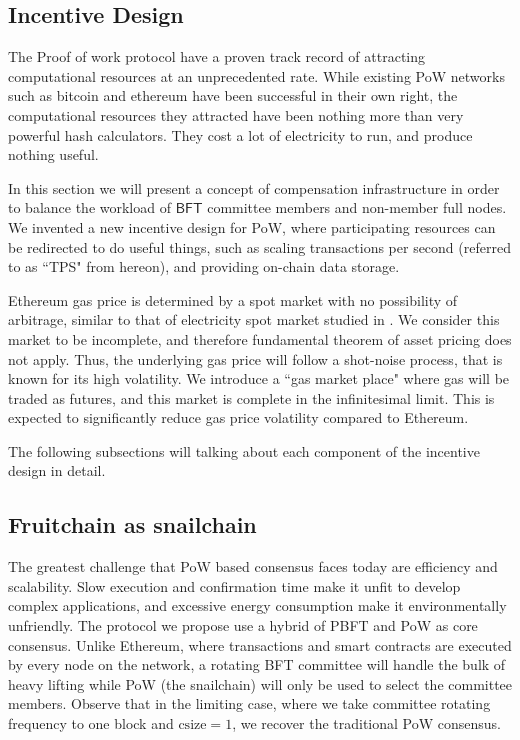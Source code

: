 \documentclass[9pt,oneside]{amsart}
\begin{document}
\begin{multicols}{2}
\section{Incentive Design}
The Proof of work protocol have a proven track record of attracting computational resources at an unprecedented rate. While existing PoW networks such as bitcoin and ethereum have been successful in their own right, the computational resources they attracted have been nothing more than very powerful hash calculators. They cost a lot of electricity to run, and produce nothing useful. 

In this section we will present a concept of compensation infrastructure in order to balance the workload of $\mathsf{BFT}$ committee members and non-member full nodes. We invented a new incentive design for PoW, where participating resources can be redirected to do useful things, such as scaling transactions per second (referred to as ``TPS" from hereon), and providing on-chain data storage. 

Ethereum gas price is determined by a spot market with no possibility of arbitrage, similar to that of electricity spot market studied in \cite{schmidt08}. We consider this market to be incomplete, and therefore fundamental theorem of asset pricing does not apply\cite{delbaen94}. Thus, the underlying gas price will follow a shot-noise process, that is known for its high volatility. We introduce a ``gas market place" where gas will be traded as futures, and this market is complete in the infinitesimal limit. This is expected to significantly reduce gas price volatility compared to Ethereum.

The following subsections will talking about each component of the incentive design in detail. 

\subsection{Fruitchain as snailchain}

The greatest challenge that PoW based consensus faces today are efficiency and scalability. Slow execution and confirmation time make it unfit to develop complex applications, and excessive energy consumption make it environmentally unfriendly. The protocol we propose use a hybrid of PBFT and PoW as core consensus. Unlike Ethereum, where transactions and smart contracts are executed by every node on the network, a rotating BFT committee will handle the bulk of heavy lifting while PoW (the snailchain) will only be used to select the committee members. Observe that in the limiting case, where we take committee rotating frequency to one block and $\mathrm{csize} = 1$, we recover the traditional PoW consensus. 


\end{multicols}
\end{document}
